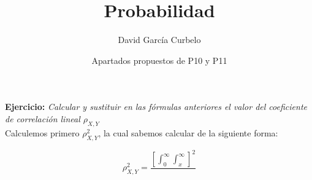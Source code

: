 \documentclass[fleqn]{article}
\author{David García Curbelo}
\title{Probabilidad}
\date{Apartados propuestos de P10 y P11}
\begin{document}
    \maketitle
    \setcounter{page}{1}
    \pagestyle{plain}

    \textbf{Ejercicio: } \textit{Calcular y sustituir en las fórmulas anteriores el valor del coeficiente de correlación lineal $\rho_{X,Y}$} \\ 

    Calculemos primero $\rho^2_{X,Y}$, la cual sabemos calcular de la siguiente forma:

    $$\rho_{X,Y}^2 = \frac{ \left[ \int_0^{\infty} \int_x^{\infty} \right]^2 }{}$$
\end{document}
